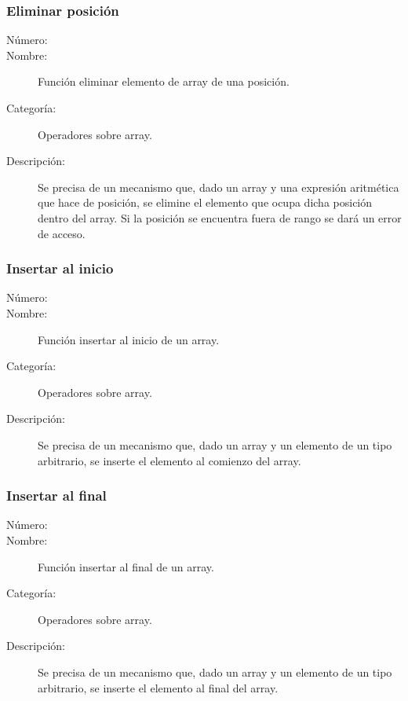 \subsubsection{Eliminar posición}
	\begin{description}
		\item [Número:] \cn
		\item [Nombre:] Función eliminar elemento de array de una posición.
		\item [Categoría:] Operadores sobre array.
		\item [Descripción:] Se precisa de un mecanismo que, dado un array y una expresión aritmética que hace de posición, se elimine el elemento que ocupa dicha posición dentro del array.
Si la posición se encuentra fuera de rango se dará un error de acceso.
	\end {description}

\subsubsection{Insertar al inicio}
	\begin{description}
		\item [Número:] \cn
		\item [Nombre:] Función insertar al inicio de un array.
		\item [Categoría:] Operadores sobre array.
		\item [Descripción:] Se precisa de un mecanismo que, dado un array y un elemento de un tipo arbitrario, se inserte el elemento al comienzo del array.
	\end {description}

\subsubsection{Insertar al final}
	\begin{description}
		\item [Número:] \cn
		\item [Nombre:] Función insertar al final de un array.
		\item [Categoría:] Operadores sobre array.
		\item [Descripción:] Se precisa de un mecanismo que, dado un array y un elemento de un tipo arbitrario, se inserte el elemento al final del array.
	\end {description}


